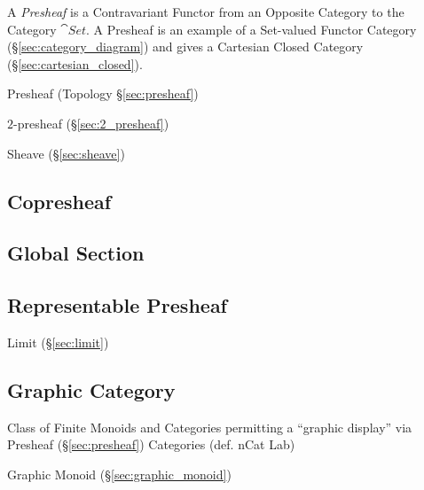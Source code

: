 A \emph{Presheaf} is a Contravariant Functor from an Opposite Category
to the Category $\cat{Set}$. A Presheaf is an example of a
Set-valued Functor Category (\S\ref{sec:category_diagram}) and gives a
Cartesian Closed Category (\S\ref{sec:cartesian_closed}).

Presheaf (Topology \S\ref{sec:presheaf})

$2$-presheaf (\S\ref{sec:2_presheaf})

Sheave (\S\ref{sec:sheave})



\subsection{Copresheaf}\label{sec:copresheaf}

\subsection{Global Section}\label{sec:global_section}

\subsection{Representable Presheaf}\label{sec:representable_presheaf}

Limit (\S\ref{sec:limit})



\subsection{Graphic Category}\label{sec:graphic_category}

Class of Finite Monoids and Categories permitting a ``graphic
display'' via Presheaf (\S\ref{sec:presheaf}) Categories
(def. nCat Lab) %

Graphic Monoid (\S\ref{sec:graphic_monoid})



